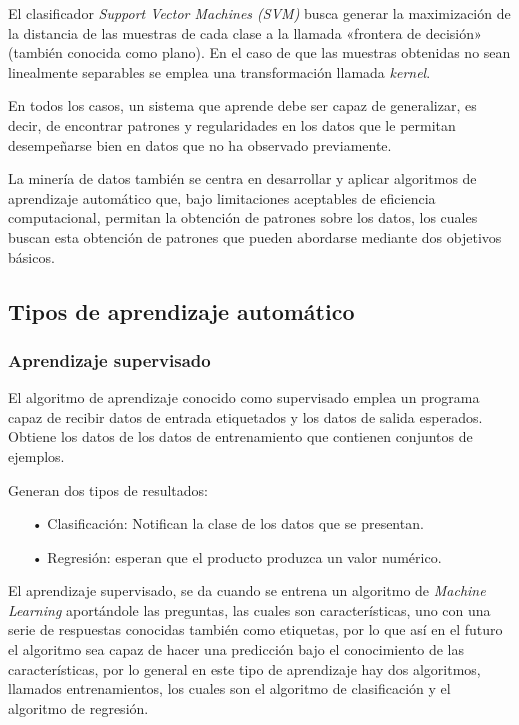 El clasificador \textit{Support Vector Machines (SVM)} busca generar la maximización de la distancia de las muestras de cada clase a la llamada «frontera de decisión» (también conocida como plano). En el caso de que las muestras obtenidas no sean linealmente separables se emplea una transformación llamada \textit{kernel}.

En todos los casos, un sistema que aprende debe ser capaz de generalizar, es decir, de encontrar patrones y regularidades en los datos que le permitan desempeñarse bien en datos que no ha observado previamente.

La minería de datos también se centra en desarrollar y aplicar algoritmos de aprendizaje automático que, bajo limitaciones aceptables de eficiencia computacional, permitan la obtención de patrones sobre los datos, los cuales buscan esta obtención de patrones que pueden abordarse mediante dos objetivos básicos.


\subsection{Tipos de aprendizaje automático}

\subsubsection{Aprendizaje supervisado}

El algoritmo de aprendizaje conocido como supervisado emplea un programa capaz de recibir datos de entrada etiquetados y los datos de salida esperados. Obtiene los datos de los datos de entrenamiento que contienen conjuntos de ejemplos.

Generan dos tipos de resultados:
\begin{itemize}
\item[•] Clasificación: Notifican la clase de los datos que se presentan.
\item[•] Regresión: esperan que el producto produzca un valor numérico.
\end{itemize}

El aprendizaje supervisado, se da cuando se entrena un algoritmo de \textit{Machine Learning} aportándole las preguntas, las cuales son características, uno con una serie de respuestas conocidas también como etiquetas, por lo que así en el futuro el algoritmo sea capaz de hacer una predicción bajo el conocimiento de las características, por lo general en este tipo de aprendizaje hay dos algoritmos, llamados entrenamientos, los cuales son el algoritmo de clasificación y el algoritmo de regresión.

